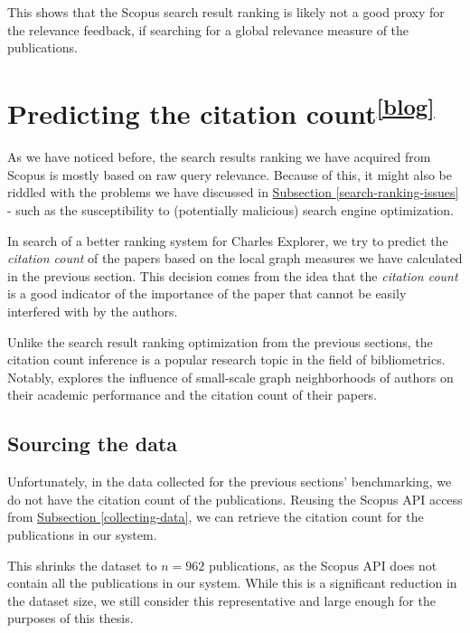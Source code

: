 This shows that the Scopus search result ranking is likely not a good proxy for the relevance feedback,
if searching for a global relevance measure of the publications.

\section[Predicting the citation count]{Predicting the citation count\textsuperscript{\href{https://jindrich.bar/edu/thesis-blog/citation-count/}{[blog]}}}

As we have noticed before, the search results ranking we have acquired from Scopus is mostly based on raw query relevance. 
Because of this, it might also be riddled with the problems we have discussed in \hyperref[search-ranking-issues]{Subsection \ref*{search-ranking-issues}} - 
such as the susceptibility to (potentially malicious) search engine optimization.

In search of a better ranking system for Charles Explorer, we try to predict the \textit{citation count} of the papers based on the local graph measures we have calculated in the previous section. 
This decision comes from the idea that the \textit{citation count} is a good indicator of the importance of the paper that cannot be easily interfered with by the authors.

Unlike the search result ranking optimization from the previous sections, the citation count inference is a popular research topic in the field of bibliometrics.
Notably, \cite{ABBASI2011594} explores the influence of small-scale graph neighborhoods of authors on their academic performance and the citation count of their papers.

\subsection{Sourcing the data}

Unfortunately, in the data collected for the previous sections' benchmarking, we do not have the citation count of the publications.
Reusing the Scopus API access from \hyperref[collecting-data]{Subsection \ref*{collecting-data}}, we can retrieve the citation count for the publications in our system.

This shrinks the dataset to $n = 962$ publications, as the Scopus API does not contain all the publications in our system.
While this is a significant reduction in the dataset size, we still consider this representative and large enough for the purposes of this thesis.

